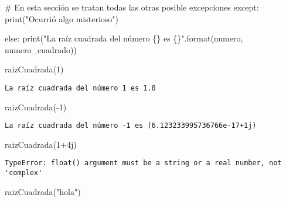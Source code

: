 \documentclass[
  letterpaper,
  DIV=11,
  numbers=noendperiod]{scrreprt}
\newenvironment{Shaded}{\begin{snugshade}}{\end{snugshade}}
\newcommand{\BuiltInTok}[1]{\textcolor[rgb]{0.00,0.23,0.31}{#1}}
\newcommand{\CommentTok}[1]{\textcolor[rgb]{0.37,0.37,0.37}{#1}}
\newcommand{\ControlFlowTok}[1]{\textcolor[rgb]{0.00,0.23,0.31}{#1}}
\newcommand{\DecValTok}[1]{\textcolor[rgb]{0.68,0.00,0.00}{#1}}
\newcommand{\NormalTok}[1]{\textcolor[rgb]{0.00,0.23,0.31}{#1}}
\newcommand{\OperatorTok}[1]{\textcolor[rgb]{0.37,0.37,0.37}{#1}}
\newcommand{\OtherTok}[1]{\textcolor[rgb]{0.00,0.23,0.31}{#1}}
\newcommand{\SpecialCharTok}[1]{\textcolor[rgb]{0.37,0.37,0.37}{#1}}
\newcommand{\StringTok}[1]{\textcolor[rgb]{0.13,0.47,0.30}{#1}}
\begin{document}
\begin{Shaded}
\begin{Highlighting}[]
    \CommentTok{\# En esta sección se tratan todas las otras posible excepciones}
    \ControlFlowTok{except}\NormalTok{:}
        \BuiltInTok{print}\NormalTok{(}\StringTok{"Ocurrió algo misterioso"}\NormalTok{)}

    \ControlFlowTok{else}\NormalTok{:}
        \BuiltInTok{print}\NormalTok{(}\StringTok{"La raíz cuadrada del número }\SpecialCharTok{\{\}}\StringTok{ es }\SpecialCharTok{\{\}}\StringTok{"}\NormalTok{.}\BuiltInTok{format}\NormalTok{(numero, numero\_cuadrado))}
\end{Highlighting}
\end{Shaded}

\begin{Shaded}
\begin{Highlighting}[]
\NormalTok{raizCuadrada(}\DecValTok{1}\NormalTok{)}
\end{Highlighting}
\end{Shaded}

\begin{verbatim}
La raíz cuadrada del número 1 es 1.0
\end{verbatim}

\begin{Shaded}
\begin{Highlighting}[]
\NormalTok{raizCuadrada(}\OperatorTok{{-}}\DecValTok{1}\NormalTok{)}
\end{Highlighting}
\end{Shaded}

\begin{verbatim}
La raíz cuadrada del número -1 es (6.123233995736766e-17+1j)
\end{verbatim}

\begin{Shaded}
\begin{Highlighting}[]
\NormalTok{raizCuadrada(}\DecValTok{1}\OperatorTok{+}\OtherTok{4j}\NormalTok{)}
\end{Highlighting}
\end{Shaded}

\begin{verbatim}
TypeError: float() argument must be a string or a real number, not 'complex'
\end{verbatim}

\begin{Shaded}
\begin{Highlighting}[]
\NormalTok{raizCuadrada(}\StringTok{"hola"}\NormalTok{)}
\end{Highlighting}
\end{Shaded}
\end{document}
